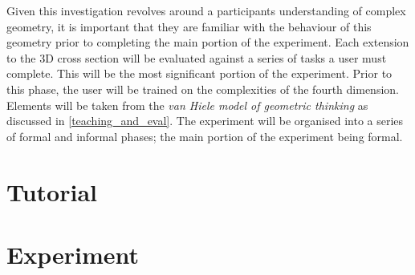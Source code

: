 \documentclass{l4proj}
\begin{document}
%






Given this investigation revolves around a participants understanding of complex geometry, it is important that they are familiar with the behaviour of this geometry prior to completing the main portion of the experiment.
Each extension to the 3D cross section will be evaluated against a series of tasks a user must complete. This will be the most significant portion of the experiment. Prior to this phase, the user will be trained on the complexities of the fourth dimension. Elements will be taken from the \textit{van Hiele model of geometric thinking} as discussed in \cref{teaching_and_eval}. 
%
The experiment will be organised into a series of formal and informal phases; the main portion of the experiment being formal.

\section{Tutorial}



\section{Experiment}
\label{experimental_design}
\end{document}
